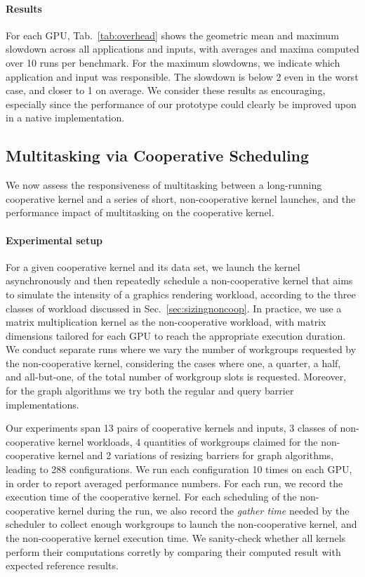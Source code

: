 \documentclass[numbers,nocopyrightspace,10pt]{sigplanconf}
\newcommand{\mytab}{Tab.~}
\newcommand{\mysec}{Sec.~}
\begin{document}
\paragraph{Results}
For each GPU, \mytab\ref{tab:overhead} shows the geometric mean and
maximum slowdown across all applications and inputs, with averages and
maxima computed over 10 runs per benchmark. For the maximum slowdowns,
we indicate which application and input was responsible. The slowdown is
below 2 even in the worst case, and closer to 1 on average. We consider
these results as encouraging, especially since the performance of our
prototype could clearly be improved upon in a native implementation.

\subsection{Multitasking via Cooperative Scheduling}\label{sec:responsiveness}

We now assess the responsiveness of multitasking between a long-running cooperative kernel and a series of
short, non-cooperative kernel launches, and the performance impact of multitasking on the cooperative kernel.


\paragraph{Experimental setup}
For a given cooperative kernel and its data set, we launch the kernel
asynchronously and then repeatedly schedule a non-cooperative kernel
that aims to simulate the intensity of a graphics rendering workload,
according to the three classes of workload discussed in \mysec\ref{sec:sizingnoncoop}. In
practice, we use a matrix multiplication kernel as the non-cooperative
workload, with matrix dimensions tailored for each GPU to reach the
appropriate execution duration.  We conduct separate runs where we vary
the number of workgroups requested by the non-cooperative kernel,
considering the cases where one, a quarter, a half, and all-but-one, of
the total number of workgroup slots is requested.  Moreover, for the
graph algorithms we try both the regular and query barrier
implementations.

Our experiments span 13 pairs of cooperative kernels and inputs, 3
classes of non-cooperative kernel workloads, 4 quantities of workgroups
claimed for the non-cooperative kernel and 2 variations of resizing
barriers for graph algorithms, leading to 288 configurations.  We run
each configuration 10 times on each GPU, in order to report averaged
performance numbers. For each run, we record the execution time of the
cooperative kernel. For each scheduling of the non-cooperative kernel
during the run, we also record the \emph{gather time} needed by the
scheduler to collect enough workgroups to launch the non-cooperative
kernel, and the non-cooperative kernel execution time. We sanity-check
whether all kernels perform their computations corretly by comparing
their computed result with expected reference results.
\end{document}
